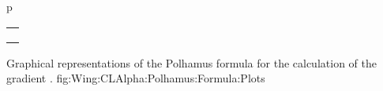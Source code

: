 \documentclass[[12pt,twoside]{book}
\begin{document}
\EnlargedFigureX%
  {p}%
  {%
    \centering
    \begin{tabular}{@{}c@{}}
      \subfloat%
          [%
            \smash{$C_{L_\mathlarger{\alpha}}$} as $\Mach$ changes, for different values of parameter $\AR$.
          ]%
          {\label{fig:Wing:CLAlpha:Polhamus:Formula:Plots:A}%
		      \includegraphics%
		        [width=0.45\textwidth]%
		        {Chapter_2/lift_gradient_polhamus_formula/plot_wing_CLalpha_LamLE15_lam05.pdf}%
          }%
      \\
      \subfloat%
          [%
            \smash{$C_{L_\mathlarger{\alpha}}$} as $\Mach$ changes, for different values of parameter $\Lambda_\text{le}$.
          ]%
          {\label{fig:Wing:CLAlpha:Polhamus:Formula:Plots:B}%
		      \includegraphics%
		        [width=0.45\textwidth]%
		        {Chapter_2/lift_gradient_polhamus_formula/plot_wing_CLalpha_lam05_AR5.pdf}%
          }%
      \\
      \subfloat%
          [%
            \smash{$C_{L_\mathlarger{\alpha}}$} as $\Mach$ changes, for different values of parameter $\lambda$.
          ]%
          {\label{fig:Wing:CLAlpha:Polhamus:Formula:Plots:C}%
		      \includegraphics%
		        [width=0.45\textwidth]%
		        {Chapter_2/lift_gradient_polhamus_formula/plot_wing_CLalpha_LamLE15_AR5.pdf}%
          }%
    \end{tabular}
  }%
  {
    Graphical representations of the Polhamus formula for the calculation of the gradient .%
  }%
  {fig:Wing:CLAlpha:Polhamus:Formula:Plots}%
%
\end{document}
